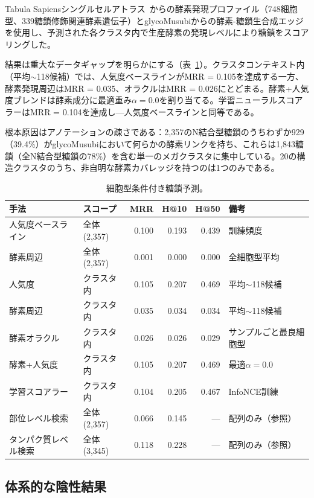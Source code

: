 \documentclass[11pt,a4paper]{ltjsarticle}
\begin{document}
Tabula Sapiensシングルセルアトラス~\cite{tabulasapiens2022}からの酵素発現プロファイル（748細胞型、339糖鎖修飾関連酵素遺伝子）とglycoMusubiからの酵素-糖鎖生合成エッジを使用し、予測された各クラスタ内で生産酵素の発現レベルにより糖鎖をスコアリングした。

結果は重大なデータギャップを明らかにする（表~\ref{tab:celltype}）。クラスタコンテキスト内（平均$\sim$118候補）では、人気度ベースラインがMRR = 0.105を達成する一方、酵素発現周辺はMRR = 0.035、オラクルはMRR = 0.026にとどまる。酵素+人気度ブレンドは酵素成分に最適重み$\alpha = 0.0$を割り当てる。学習ニューラルスコアラーはMRR = 0.104を達成し---人気度ベースラインと同等である。

根本原因はアノテーションの疎さである：2,357のN結合型糖鎖のうちわずか929（39.4\%）がglycoMusubiにおいて何らかの酵素リンクを持ち、これらは1,843糖鎖（全N結合型糖鎖の78\%）を含む単一のメガクラスタに集中している。20の構造クラスタのうち、非自明な酵素カバレッジを持つのは1つのみである。

\begin{table}[ht]
\centering
\caption{細胞型条件付き糖鎖予測。}
\label{tab:celltype}
\small
\begin{tabular}{llrrrp{3.5cm}}
\toprule
\textbf{手法} & \textbf{スコープ} & \textbf{MRR} & \textbf{H@10} & \textbf{H@50} & \textbf{備考} \\
\midrule
人気度ベースライン & 全体(2,357) & 0.100 & 0.193 & 0.439 & 訓練頻度 \\
酵素周辺 & 全体(2,357) & 0.001 & 0.000 & 0.000 & 全細胞型平均 \\
\midrule
人気度 & クラスタ内 & 0.105 & 0.207 & 0.469 & 平均$\sim$118候補 \\
酵素周辺 & クラスタ内 & 0.035 & 0.034 & 0.034 & 平均$\sim$118候補 \\
酵素オラクル & クラスタ内 & 0.026 & 0.026 & 0.029 & サンプルごと最良細胞型 \\
酵素+人気度 & クラスタ内 & 0.105 & 0.207 & 0.469 & 最適$\alpha = 0.0$ \\
学習スコアラー & クラスタ内 & 0.104 & 0.205 & 0.467 & InfoNCE訓練 \\
\midrule
部位レベル検索 & 全体(2,357) & 0.066 & 0.145 & --- & 配列のみ（参照） \\
タンパク質レベル検索 & 全体(3,345) & 0.118 & 0.228 & --- & 配列のみ（参照） \\
\bottomrule
\end{tabular}
\end{table}

\subsection{体系的な陰性結果}
\end{document}
